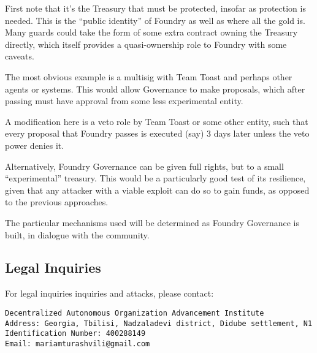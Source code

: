 \documentclass{article}
\begin{document}
First note that it's the Treasury that must be protected, insofar as protection is needed. This is the ``public identity'' of Foundry as well as where all the gold is. Many guards could take the form of some extra contract owning the Treasury directly, which itself provides a quasi-ownership role to Foundry with some caveats.

The most obvious example is a multisig with Team Toast and perhaps other agents or systems. This would allow Governance to make proposals, which after passing must have approval from some less experimental entity.

A modification here is a veto role by Team Toast or some other entity, such that every proposal that Foundry passes is executed (say) 3 days later unless the veto power denies it.

Alternatively, Foundry Governance can be given full rights, but to a small ``experimental'' treasury. This would be a particularly good test of its resilience, given that any attacker with a viable exploit can do so to gain funds, as opposed to the previous approaches.

The particular mechanisms used will be determined as Foundry Governance is built, in dialogue with the community.

\subsection{Legal Inquiries} \label{legal}

For legal inquiries inquiries and attacks, please contact:

\begin{verbatim}
Decentralized Autonomous Organization Advancement Institute
Address: Georgia, Tbilisi, Nadzaladevi district, Didube settlement, N1
Identification Number: 400288149
Email: mariamturashvili@gmail.com
\end{verbatim}
\end{document}
